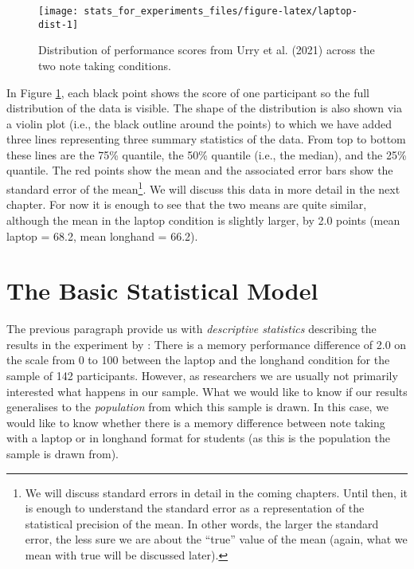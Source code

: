 \documentclass[
]{book}
\begin{document}
\begin{figure}

{\centering \texttt{[image: stats\_for\_experiments\_files/figure-latex/laptop-dist-1]} 

}

\caption{Distribution of performance scores from Urry et al. (2021) across the two note taking conditions.}\label{fig:laptop-dist}
\end{figure}

In Figure \ref{fig:laptop-dist}, each black point shows the score of one participant so the full distribution of the data is visible. The shape of the distribution is also shown via a violin plot (i.e., the black outline around the points) to which we have added three lines representing three summary statistics of the data. From top to bottom these lines are the 75\% quantile, the 50\% quantile (i.e., the median), and the 25\% quantile. The red points show the mean and the associated error bars show the standard error of the mean\footnote{We will discuss standard errors in detail in the coming chapters. Until then, it is enough to understand the standard error as a representation of the statistical precision of the mean. In other words, the larger the standard error, the less sure we are about the ``true'' value of the mean (again, what we mean with true will be discussed later).}. We will discuss this data in more detail in the next chapter. For now it is enough to see that the two means are quite similar, although the mean in the laptop condition is slightly larger, by 2.0 points (mean laptop = 68.2, mean longhand = 66.2).

\hypertarget{the-basic-statistical-model}{%
\section{The Basic Statistical Model}\label{the-basic-statistical-model}}

The previous paragraph provide us with \emph{descriptive statistics} describing the results in the experiment by \citet{urry2021}: There is a memory performance difference of 2.0 on the scale from 0 to 100 between the laptop and the longhand condition for the sample of 142 participants. However, as researchers we are usually not primarily interested what happens in our sample. What we would like to know if our results generalises to the \emph{population} from which this sample is drawn. In this case, we would like to know whether there is a memory difference between note taking with a laptop or in longhand format for students (as this is the population the sample is drawn from).
\end{document}
